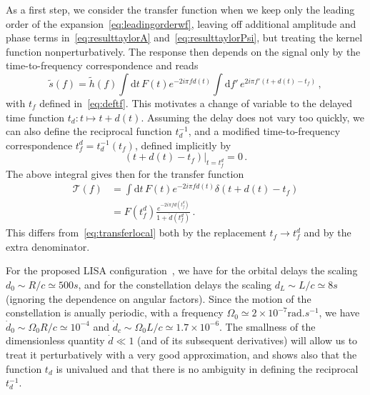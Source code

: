 \documentclass[aps,showpacs,twocolumn,
prd,superscriptaddress,nofootinbib]{revtex4-1}
\newcommand{\be}{\begin{equation}}
\newcommand{\ee}{\end{equation}}
\newcommand\ud{{\mathrm{d}}}
\newcommand\calT{{\mathcal{T}}}
\newcommand{\nn}{\nonumber}
\newcommand{\tf}{t_{f}}
\newcommand{\tfd}{t_{f}^{d}}
\begin{document}
As a first step, we consider the transfer function when we keep only the leading order of the expansion~\eqref{eq:leadingorderwf}, leaving off additional amplitude and phase terms in~\eqref{eq:resulttaylorA} and~\eqref{eq:resulttaylorPsi}, but treating the kernel function nonperturbatively. The response then depends on the signal only by the time-to-frequency correspondence and reads
\begin{equation}
	\tilde{s}(f) = \tilde{h}(f) \int \ud t \, F(t) e^{-2i\pi f d(t)} \int \ud f' \, e^{2i\pi f' (t+d(t) - t_{f})} \,,
\end{equation}
with $\tf$ defined in~\eqref{eq:deftf}. This motivates a change of variable to the delayed time function $t_{d}:t \mapsto t+d(t)$. Assuming the delay does not vary too quickly, we can also define the reciprocal function $t_{d}^{-1}$, and a modified time-to-frequency correspondence $\tfd = t_{d}^{-1}(\tf)$, defined implicitly by
\be
	\left. (t + d(t) - t_{f})\right|_{t=t_{f}^{d}} = 0 \,.
\ee
The above integral gives then for the transfer function
\begin{align}\label{eq:delaycorrleading}
	\calT(f) &= \int \ud t \, F(t) e^{-2i\pi f d(t)} \delta(t + d(t) - t_{f}) \nn \\
	&= F(t_{f}^{d}) \frac{e^{-2i\pi f d(t_{f}^{d})}}{1+\dot{d}(t_{f}^{d})} \,.
\end{align}
This differs from~\eqref{eq:transferlocal} both by the replacement $\tf \rightarrow t_{f}^{d}$ and by the extra denominator.

For the proposed LISA configuration~\cite{LISA17}, we have for the orbital delays the scaling $d_{0}\sim R/c \simeq 500s$, and for the constellation delays the scaling $d_{L}\sim L/c \simeq 8s$ (ignoring the dependence on angular factors). Since the motion of the constellation is anually periodic, with a frequency $\Omega_{0} \simeq 2 \times 10^{-7}\mathrm{rad}.s^{-1}$, we have $\dot{d}_{0} \sim \Omega_{0} R/c \simeq 10^{-4}$ and $\dot{d}_{c} \sim \Omega_{0} L/c \simeq 1.7 \times 10^{-6}$. The smallness of the dimensionless quantity $\dot{d} \ll 1$ (and of its subsequent derivatives) will allow us to treat it perturbatively with a very good approximation, and shows also that the function $t_{d}$ is univalued and that there is no ambiguity in defining the reciprocal $t_{d}^{-1}$.
\end{document}
